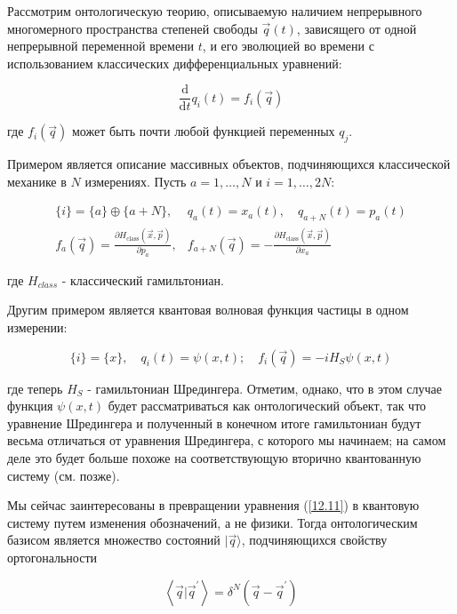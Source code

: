 \documentclass[main.tex]{subfiles}
\begin{document}
Рассмотрим онтологическую теорию, описываемую наличием непрерывного многомерного пространства степеней свободы $\vec q(t)$, зависящего от одной непрерывной переменной времени $t$, и его эволюцией во времени с использованием классических дифференциальных уравнений:

\begin{equation}\label{12.11}
	\frac{\mathrm{d}}{\mathrm{d} t} q_{i}(t)=f_{i}(\vec{q})
\end{equation}

где $f_i(\vec q)$ может быть почти любой функцией переменных $q_j$.

Примером является описание массивных объектов, подчиняющихся классической механике в $N$ измерениях. Пусть $a = 1,\ldots, N$ и $i = 1,\ldots,2N$:

\begin{equation}\label{12.12}
	\begin{aligned}\{i\}=\{a\} \oplus\{a+N\}, & q_{a}(t)=x_{a}(t), \quad q_{a+N}(t)=p_{a}(t) \\ f_{a}(\vec{q})=\frac{\partial H_{\mathrm{class}}(\vec{x}, \vec{p})}{\partial p_{a}}, & f_{a+N}(\vec{q})=-\frac{\partial H_{\mathrm{class}}(\vec{x}, \vec{p})}{\partial x_{a}} \end{aligned}
\end{equation}

где $H_{class}$ - классический гамильтониан.

Другим примером является квантовая волновая функция частицы в одном измерении:

\begin{equation}\label{12.13}
	\{i\}=\{x\}, \quad q_{i}(t)=\psi(x, t) ; \quad f_{i}(\vec{q})=-i H_{S} \psi(x, t)
\end{equation}

где теперь $H_S$ - гамильтониан Шредингера. Отметим, однако, что в этом случае функция $\psi(x, t)$ будет рассматриваться как онтологический объект, так что уравнение Шредингера и полученный в конечном итоге гамильтониан будут весьма отличаться от уравнения Шредингера, с которого мы начинаем; на самом деле это будет больше похоже на соответствующую вторично квантованную систему (см. позже).

Мы сейчас заинтересованы в превращении уравнения (\ref{12.11}) в квантовую систему путем изменения обозначений, а не физики. Тогда онтологическим базисом является множество состояний $\mid \vec q \rangle$, подчиняющихся свойству ортогональности

\begin{equation}\label{12.14}
	\left\langle\vec{q} | \vec{q}^{\prime}\right\rangle=\delta^{N}\left(\vec{q}-\vec{q}^{\prime}\right)
\end{equation}
           
\end{document}
